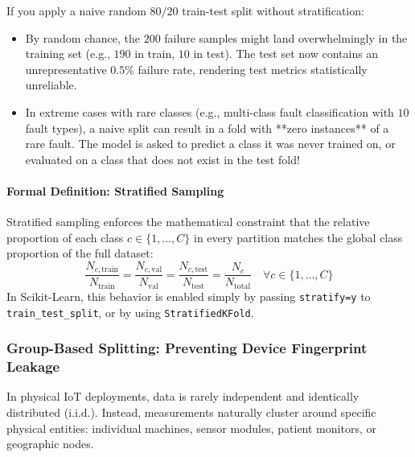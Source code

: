 If you apply a naive random $80/20$ train-test split without stratification:
\begin{itemize}
    \item By random chance, the $200$ failure samples might land overwhelmingly in the training set (e.g., $190$ in train, $10$ in test). The test set now contains an unrepresentative $0.5\%$ failure rate, rendering test metrics statistically unreliable.
    \item In extreme cases with rare classes (e.g., multi-class fault classification with $10$ fault types), a naive split can result in a fold with **zero instances** of a rare fault. The model is asked to predict a class it was never trained on, or evaluated on a class that does not exist in the test fold!
\end{itemize}

\paragraph{Formal Definition: Stratified Sampling}
Stratified sampling enforces the mathematical constraint that the relative proportion of each class $c \in \{1, \dots, C\}$ in every partition matches the global class proportion of the full dataset:
\begin{equation}
\frac{N_{c, \text{train}}}{N_{\text{train}}} = \frac{N_{c, \text{val}}}{N_{\text{val}}} = \frac{N_{c, \text{test}}}{N_{\text{test}}} = \frac{N_c}{N_{\text{total}}} \quad \forall c \in \{1, \dots, C\}\label{eq:stratified_proportion}
\end{equation}
In Scikit-Learn, this behavior is enabled simply by passing \texttt{stratify=y} to \texttt{train\_test\_split}, or by using \texttt{StratifiedKFold}.

\subsubsection{Group-Based Splitting: Preventing Device Fingerprint Leakage}
In physical IoT deployments, data is rarely independent and identically distributed (i.i.d.). Instead, measurements naturally cluster around specific physical entities: individual machines, sensor modules, patient monitors, or geographic nodes.


